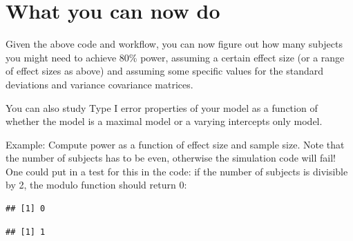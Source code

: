 \documentclass[12pt,]{krantz}
\newenvironment{Shaded}{\begin{snugshade}}{\end{snugshade}}
\newcommand{\DecValTok}[1]{\textcolor[rgb]{0.00,0.00,0.81}{#1}}
\newcommand{\OperatorTok}[1]{\textcolor[rgb]{0.81,0.36,0.00}{\textbf{#1}}}
\begin{document}
\hypertarget{what-you-can-now-do}{%
\section{What you can now do}\label{what-you-can-now-do}}

Given the above code and workflow, you can now figure out how many subjects you might need to achieve 80\% power, assuming a certain effect size (or a range of effect sizes as above) and assuming some specific values for the standard deviations and variance covariance matrices.

You can also study Type I error properties of your model as a function of whether the model is a maximal model or a varying intercepts only model.

Example: Compute power as a function of effect size and sample size. Note that the number of subjects has to be even, otherwise the simulation code will fail! One could put in a test for this in the code: if the number of subjects is divisible by 2, the modulo function should return 0:

\begin{Shaded}
\end{Shaded}

\begin{verbatim}
## [1] 0
\end{verbatim}

\begin{Shaded}
\end{Shaded}

\begin{verbatim}
## [1] 1
\end{verbatim}
\end{document}
